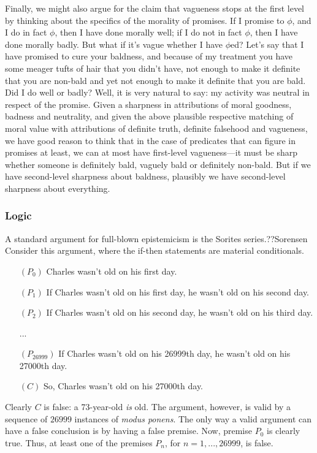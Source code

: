 Finally, we might also argue for the claim that vagueness stops at the first level by thinking about the specifics of the morality of promises. If I promise
to $\phi$, and I do in fact $\phi$, then I have done morally well; if I do not in fact $\phi$, then I have done morally badly.
But what if it's vague whether I have $\phi$ed? Let's say that I have promised to cure your baldness, and because of my treatment
you have some meager tufts of hair that you didn't have, not enough to make it definite that you are non-bald and yet not enough
to make it definite that you are bald. Did I do well or badly? Well, it is very natural to say: my activity was neutral in respect
of the promise. Given a sharpness in attributions of moral goodness, badness and neutrality, and given the above plausible respective matching
of moral value with attributions of definite truth, definite falsehood and vagueness, we have good reason to think that in the case
of predicates that can figure in promises at least, we can at most have first-level vagueness---it must be sharp whether someone is
definitely bald, vaguely bald or definitely non-bald. But if we have second-level sharpness about baldness, plausibly we have 
second-level sharpness about everything.

\subsubsection{Logic}
A standard argument for full-blown epistemicism is the Sorites series.??Sorensen
Consider this argument, where the if-then statements are material conditionals.
\begin{itemize}
\item[$(P_0)$] Charles wasn't old on his first day.
\item[$(P_1)$] If Charles wasn't old on his first day, he wasn't old on his second day.
\item[$(P_2)$] If Charles wasn't old on his second day, he wasn't old on his third day.
\item[...] \ {}
\item[$(P_{26999})$] If Charles wasn't old on his 26999th day, he wasn't old on his 27000th day.
\item[$(C)$] So, Charles wasn't old on his 27000th day.
\end{itemize}

Clearly $C$ is false: a 73-year-old \textit{is} old. The argument, however, is valid by 
a sequence of $26999$ instances of \textit{modus ponens}. The only way a valid argument
can have a false conclusion is by having a false premise. Now, premise $P_0$ is clearly
true. Thus, at least one of the premises $P_n$, for $n=1,...,26999$, is false. 

